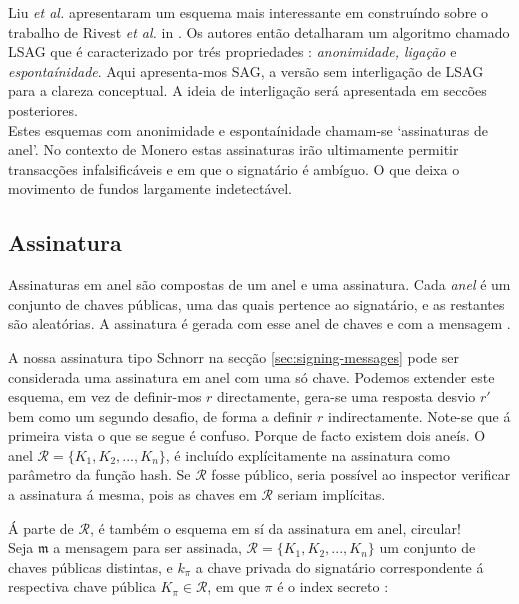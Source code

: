Liu {\em et al.} apresentaram um esquema mais interessante em \cite{Liu2004} construíndo sobre o trabalho de Rivest {\em et al.} in \cite{rivest-leak-secret}. Os autores então detalharam um algoritmo chamado LSAG que é caracterizado por trés propriedades : {\em anonimidade, ligação} e {\em espontaínidade}. Aqui apresenta-mos SAG, a versão sem interligação de LSAG para a clareza conceptual. A ideia de interligação será apresentada em seccões posteriores.
\\

Estes esquemas com anonimidade e espontaínidade chamam-se `assinaturas de anel'. No contexto de Monero estas assinaturas irão ultimamente permitir transacções infalsificáveis e em que o signatário é ambíguo. O que deixa o movimento de fundos largamente indetectável.

\subsection*{Assinatura}

Assinaturas em anel são compostas de um anel e uma assinatura. Cada {\em anel} é um conjunto de chaves públicas, uma das quais pertence ao signatário, e as restantes são aleatórias. A assinatura é gerada com esse anel de chaves e com a mensagem .

A nossa assinatura tipo Schnorr na secção \ref{sec:signing-messages} pode ser considerada uma assinatura em anel com uma só chave. Podemos extender este esquema, em vez de definir-mos $r$ directamente, gera-se uma resposta desvio $r'$ bem como um segundo desafio, de forma a definir $r$ indirectamente. Note-se que á primeira vista o que se segue é confuso. Porque de facto existem dois aneís. O anel \(\mathcal{R} = \{K_1, K_2, ..., K_n\}\), é incluído explícitamente na assinatura como parâmetro da função hash. Se $\mathcal{R}$ fosse público, seria possível ao inspector verificar a assinatura á mesma, pois as chaves em $\mathcal{R}$ seriam implícitas.

Á parte de $\mathcal{R}$, é também o esquema em sí da assinatura em anel, circular!
\\

Seja \(\mathfrak{m}\) a mensagem para ser assinada, \(\mathcal{R} = \{K_1, K_2, ..., K_n\}\) um conjunto de chaves públicas distintas, e \(k_\pi\) a chave privada do signatário correspondente á respectiva chave pública \(K_\pi \in \mathcal{R}\), em que $\pi$ é o index secreto :


